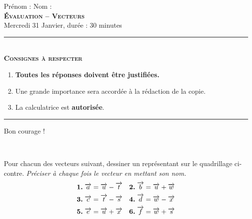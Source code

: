 \documentclass[11pt]{article}
\begin{document}
\begin{center}
  Prénom : \hfill Nom :\hfill~\\[1cm]
\textbf{\LARGE \textsc{Évaluation -- Vecteurs}}\\[2mm]

{\large Mercredi 31 Janvier, durée : 30 minutes}\\[1mm]
\noindent\rule{8cm}{0.4pt}\\[1mm]
\textbf{\textsc{Consignes à respecter}}
\begin{enumerate}[label=\textbf{\arabic*/}]
\item \textbf{Toutes les réponses doivent être justifiées.}
\item Une grande importance sera accordée à la rédaction de la
  copie.
\item La calculatrice est \textbf{autorisée}.
    \end{enumerate}
\noindent\rule{12cm}{0.4pt}
\end{center}

\begin{center}
  Bon courage !
\end{center}

\begin{exo}~\\
  \begin{minipage}[]{.35\textwidth}
    Pour chacun des vecteurs suivant, dessiner un représentant sur le
    quadrillage ci-contre. \emph{Préciser à chaque fois le vecteur en mettant
    son nom.}
    \begin{align*}
      \textbf{1.}\;& \overrightarrow{a} = \overrightarrow{u} - \overrightarrow{t} &
      \textbf{2.}\;& \overrightarrow{b} = \overrightarrow{u} + \overrightarrow{w} \\
      \textbf{3.}\;& \overrightarrow{c} = \overrightarrow{t} - \overrightarrow{s} &
      \textbf{4.}\;& \overrightarrow{d} = \overrightarrow{w} - \overrightarrow{x} \\
      \textbf{5.}\;& \overrightarrow{e} = \overrightarrow{u} + \overrightarrow{x} &
      \textbf{6.}\;& \overrightarrow{f} = \overrightarrow{w} + \overrightarrow{s}
    \end{align*}
  \end{minipage}
  \begin{minipage}[]{.65\textwidth}
    \begin{center}
    \end{center}
  \end{minipage}
\end{exo}
\end{document}
